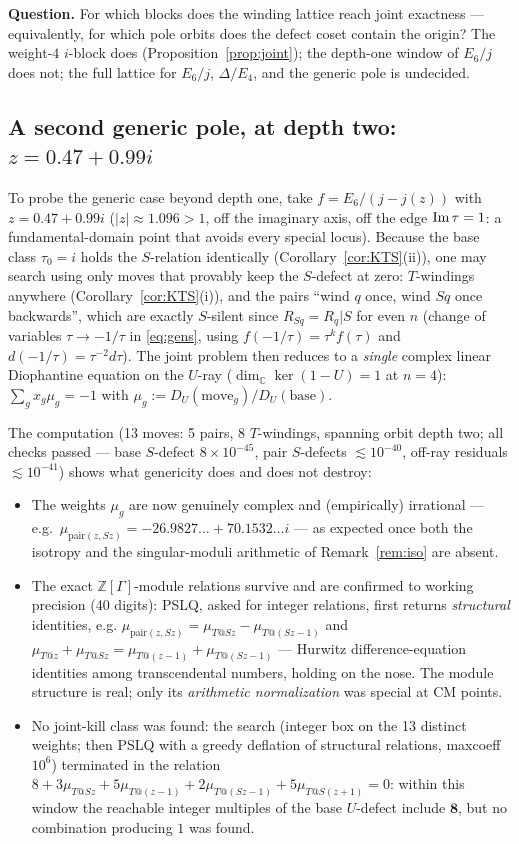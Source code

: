 \documentclass[11pt]{article}
\theoremstyle{definition}
\theoremstyle{remark}
\newcommand{\ZZ}{\mathbb{Z}}
\newcommand{\CC}{\mathbb{C}}
\begin{document}
\smallskip
\noindent\textbf{Question.}
For which blocks does the winding lattice reach joint exactness --- equivalently, for
which pole orbits does the defect coset contain the origin?  The weight-$4$ $i$-block
does (Proposition~\ref{prop:joint}); the depth-one window of $E_6/j$ does not; the full
lattice for $E_6/j$, $\Delta/E_4$, and the generic pole is undecided.

\subsection{A second generic pole, at depth two: $z=0.47+0.99i$}\label{sec:z047}

To probe the generic case beyond depth one, take $f=E_6/(j-j(z))$ with $z=0.47+0.99i$
($|z|\approx1.096>1$, off the imaginary axis, off the edge ${\rm Im}\,\tau=1$: a
fundamental-domain point that avoids every special locus).  Because the base class
$\tau_0=i$ holds the $S$-relation identically (Corollary~\ref{cor:KTS}(ii)), one may
search using only moves that provably keep the $S$-defect at zero:
$T$-windings anywhere (Corollary~\ref{cor:KTS}(i)), and the pairs
``wind $q$ once, wind $Sq$ once backwards'', which are exactly $S$-silent since
$R_{Sq}=R_q|S$ for even $n$ (change of variables $\tau\to-1/\tau$ in \eqref{eq:gens},
using $f(-1/\tau)=\tau^kf(\tau)$ and $d(-1/\tau)=\tau^{-2}d\tau$).  The joint problem then reduces to a \emph{single} complex
linear Diophantine equation on the $U$-ray ($\dim_\CC\ker(1-U)=1$ at $n=4$):
$\sum_g x_g\mu_g=-1$ with $\mu_g:=D_U(\text{move}_g)/D_U(\text{base})$.

The computation (13 moves: 5 pairs, 8 $T$-windings, spanning orbit depth two; all checks
passed --- base $S$-defect $8\times10^{-45}$, pair $S$-defects $\lesssim10^{-40}$,
off-ray residuals $\lesssim10^{-41}$) shows what genericity does and does not destroy:

\begin{itemize}
\item The weights $\mu_g$ are now genuinely complex and (empirically) irrational ---
e.g.\ $\mu_{\mathrm{pair}(z,Sz)}=-26.9827\ldots+70.1532\ldots i$ --- as expected once
both the isotropy and the singular-moduli arithmetic of Remark~\ref{rem:iso} are absent.
\item The exact $\ZZ[\Gamma]$-module relations survive and are confirmed to working
precision (40 digits): PSLQ, asked for integer relations, first returns \emph{structural}
identities, e.g.
$\mu_{\mathrm{pair}(z,Sz)}=\mu_{T@Sz}-\mu_{T@(Sz-1)}$
and
$\mu_{T@z}+\mu_{T@Sz}=\mu_{T@(z-1)}+\mu_{T@(Sz-1)}$
--- Hurwitz difference-equation identities among transcendental numbers, holding on the
nose.  The module structure is real; only its \emph{arithmetic normalization} was special
at CM points.
\item No joint-kill class was found: the search (integer box on the 13 distinct weights;
then PSLQ with a greedy deflation of structural relations, maxcoeff $10^6$) terminated in
the relation
$8+3\mu_{T@Sz}+5\mu_{T@(z-1)}+2\mu_{T@(Sz-1)}+5\mu_{T@S(z+1)}=0$:
within this window the reachable integer multiples of the base $U$-defect include
$\mathbf{8}$, but no combination producing $1$ was found.
\end{itemize}
\end{document}

